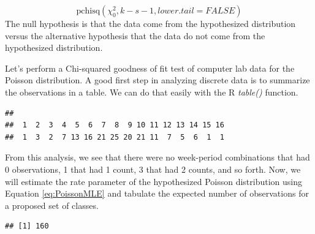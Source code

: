 \documentclass[
]{book}
\newenvironment{Shaded}{\begin{snugshade}}{\end{snugshade}}
\newcommand{\CommentTok}[1]{\textcolor[rgb]{0.56,0.35,0.01}{\textit{#1}}}
\newcommand{\FunctionTok}[1]{\textcolor[rgb]{0.00,0.00,0.00}{#1}}
\newcommand{\NormalTok}[1]{#1}
\newcommand{\OtherTok}[1]{\textcolor[rgb]{0.56,0.35,0.01}{#1}}
\newcommand{\SpecialCharTok}[1]{\textcolor[rgb]{0.00,0.00,0.00}{#1}}
\theoremstyle{definition}
\theoremstyle{definition}
\theoremstyle{definition}
\theoremstyle{definition}
\theoremstyle{remark}
\begin{document}
\[\text{pchisq}(\chi^{2}_{0},k-s-1,lower.tail=FALSE)\]
The null hypothesis is that the data come from the hypothesized
distribution versus the alternative hypothesis that the data do not come
from the hypothesized distribution.

Let's perform a Chi-squared goodness of fit test of computer lab data for the Poisson distribution. A good first step in analyzing discrete data is to summarize the observations in a table. We can do that easily with the R \emph{table()} function.

\begin{Shaded}
\end{Shaded}

\begin{verbatim}
## 
##  1  2  3  4  5  6  7  8  9 10 11 12 13 14 15 16 
##  1  3  2  7 13 16 21 25 20 21 11  7  5  6  1  1
\end{verbatim}

From this analysis, we see that there were no week-period combinations that had 0 observations, 1 that had 1 count, 3 that had 2 counts, and so forth. Now, we will estimate the rate parameter of the hypothesized Poisson distribution using Equation \eqref{eq:PoissonMLE} and tabulate the expected number of observations for a proposed set of classes.

\begin{Shaded}
\end{Shaded}

\begin{verbatim}
## [1] 160
\end{verbatim}

\begin{Shaded}
\end{Shaded}
\end{document}
